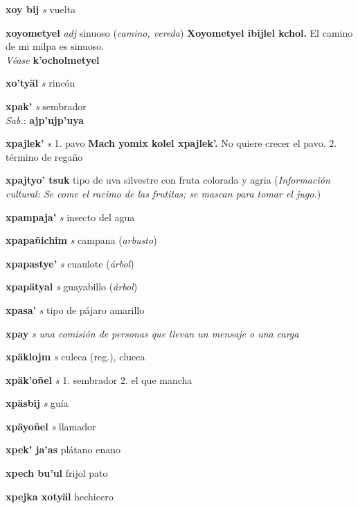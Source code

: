 \documentclass[10pt]{scrbook}
\newcommand{\entry}[1]{\textbf{#1}}
\newcommand{\onedefinition}[1]{#1.}
\newcommand{\nontranslationdef}[1]{\textit{#1}}
\newcommand{\partofspeech}[1]{\textit{#1}}
\newcommand{\spanishtranslation}[1]{#1}
\newcommand{\clarification}[1]{(\textit{#1})}
\newcommand{\cholexample}[1]{\textbf{#1}}
\newcommand{\exampletranslation}[1]{#1}
\newcommand{\dialectvariant}[1]{\\\textit{#1}:}
\newcommand{\dialectword}[1]{\textbf{#1}}
\newcommand{\alsosee}[1]{\\\textit{Véase} \textbf{#1}}
\newcommand{\culturalinformation}[1]{(\textit{#1})}
\begin{document}
\begin{multicols}{2}
\entry{xoy bij}
\partofspeech{s}
\spanishtranslation{vuelta}

\entry{xoyometyel}
\partofspeech{adj}
\spanishtranslation{sinuoso}
\clarification{camino, vereda}
\cholexample{Xoyometyel ibijlel kchol.}
\exampletranslation{El camino de mi milpa es sinuoso.}
\alsosee{k'ocholmetyel}

\entry{xo'tyäl}
\partofspeech{s}
\spanishtranslation{rincón}

\entry{xpak'}
\partofspeech{s}
\spanishtranslation{sembrador}
\dialectvariant{Sab.}
\dialectword{ajp'ujp'uya}

\entry{xpajlek'}
\partofspeech{s}
\onedefinition{1}
\spanishtranslation{pavo}
\cholexample{Mach yomix kolel xpajlek'.}
\exampletranslation{No quiere crecer el pavo.}
\onedefinition{2}
\spanishtranslation{término de regaño}

\entry{xpajtyo' tsuk}
\spanishtranslation{tipo de uva silvestre con fruta colorada y agria}
\culturalinformation{Información cultural: Se come el racimo de las frutitas; se mascan para tomar el jugo.}

\entry{xpampaja'}
\partofspeech{s}
\spanishtranslation{insecto del agua}

\entry{xpapañichim}
\partofspeech{s}
\spanishtranslation{campana}
\clarification{arbusto}

\entry{xpapastye'}
\partofspeech{s}
\spanishtranslation{cuaulote}
\clarification{árbol}

\entry{xpapätyal}
\partofspeech{s}
\spanishtranslation{guayabillo}
\clarification{árbol}

\entry{xpasa'}
\partofspeech{s}
\spanishtranslation{tipo de pájaro amarillo}

\entry{xpay}
\partofspeech{s}
\nontranslationdef{una comisión de personas que llevan un mensaje o una carga}

\entry{xpäklojm}
\partofspeech{s}
\spanishtranslation{culeca (reg.), clueca}

\entry{xpäk'oñel}
\partofspeech{s}
\onedefinition{1}
\spanishtranslation{sembrador}
\onedefinition{2}
\spanishtranslation{el que mancha}

\entry{xpäsbij}
\partofspeech{s}
\spanishtranslation{guía}

\entry{xpäyoñel}
\partofspeech{s}
\spanishtranslation{llamador}

\entry{xpek' ja'as}
\spanishtranslation{plátano enano}

\entry{xpech bu'ul}
\spanishtranslation{frijol pato}

\entry{xpejka xotyäl}
\spanishtranslation{hechicero}


\end{multicols}
\end{document}
